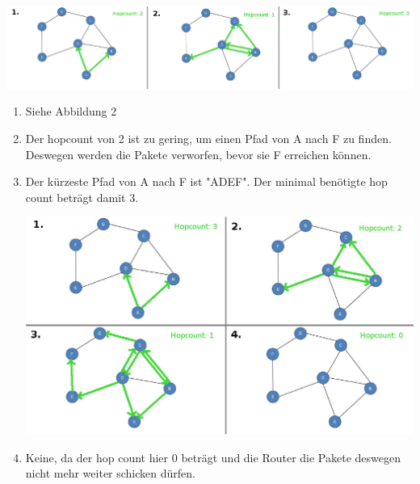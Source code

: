 \documentclass[a4paper,
			llpt,
			solution,
			accentcolor=tud2d,
			colorbacktitle
			]
			{tudexercise}
\newcommand{\8}{$\infty$}
\begin{document}
\subsection{}
\begin{center}
\includegraphics[scale=1.2]{4_1_2.jpg}
\end{center}
\begin{enumerate}	
\item Siehe Abbildung 2
\item Der hopcount von 2 ist zu gering, um einen Pfad von A nach F zu finden. Deswegen werden die Pakete verworfen, bevor sie F erreichen können.
\item Der kürzeste Pfad von A nach F ist "ADEF". Der minimal benötigte hop count beträgt damit 3.
\begin{center}
\includegraphics[scale=1.6]{4_1_2_d.jpg}
\end{center}
\item Keine, da der hop count hier 0 beträgt und die Router die Pakete deswegen nicht mehr weiter schicken dürfen.
\end{enumerate}
\end{document}
